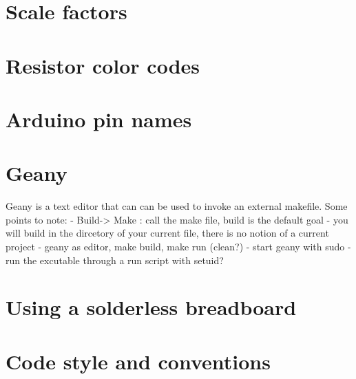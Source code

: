 \documentclass{article}
\begin{document}
\section{Scale factors}



\section{Resistor color codes}


\section{Arduino pin names}



\section{Geany}


Geany is a text editor that can can be used to invoke an external makefile.
Some points to note:
- Build-> Make : call the make file, build is the default goal
- you will build in the dircetory of your current file,
  there is no notion of a current project
  - geany as editor, make build, make run (clean?)
- start geany with sudo
- run the excutable through a run script with setuid?


\section{Using a solderless breadboard}


\section{Code style and conventions}
\end{document}

